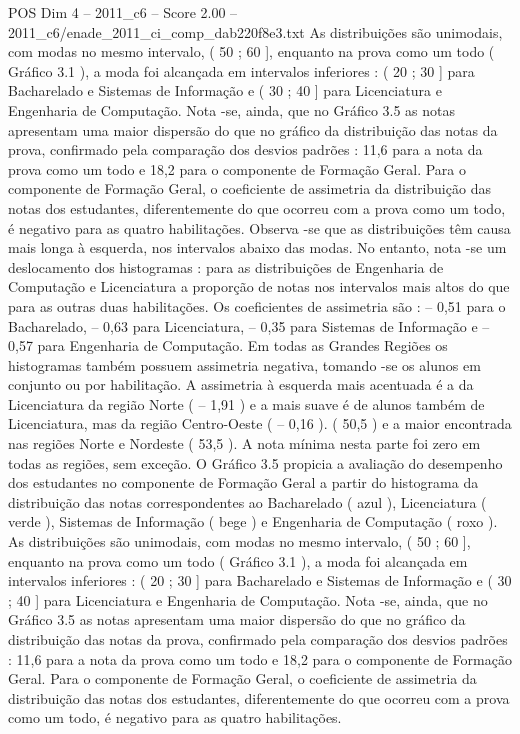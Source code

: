 \begin{textsample}{POS Dim 4 – 2011\_c6 – Score 2.00 – 2011\_c6/enade\_2011\_ci\_comp\_dab220f8e3.txt}
As distribuições são unimodais, com modas no mesmo intervalo, ( 50 ; 60 ], enquanto na prova como um todo ( Gráfico 3.1 ), a moda foi alcançada em intervalos inferiores : ( 20 ; 30 ] para Bacharelado e Sistemas de Informação e ( 30 ; 40 ] para Licenciatura e Engenharia de Computação.
Nota -se, ainda, que no Gráfico 3.5 as notas apresentam uma maior dispersão do que no gráfico da distribuição das notas da prova, confirmado pela comparação dos desvios padrões : 11,6 para a nota da prova como um todo e 18,2 para o componente de Formação Geral.
Para o componente de Formação Geral, o coeficiente de assimetria da distribuição das notas dos estudantes, diferentemente do que ocorreu com a prova como um todo, é negativo para as quatro habilitações.
Observa -se que as distribuições têm causa mais longa à esquerda, nos intervalos abaixo das modas.
No entanto, nota -se um deslocamento dos histogramas : para as distribuições de Engenharia de Computação e Licenciatura a proporção de notas nos intervalos mais altos do que para as outras duas habilitações.
Os coeficientes de assimetria são : – 0,51 para o Bacharelado, – 0,63 para Licenciatura, – 0,35 para Sistemas de Informação e – 0,57 para Engenharia de Computação.
Em todas as Grandes Regiões os histogramas também possuem assimetria negativa, tomando -se os alunos em conjunto ou por habilitação.
A assimetria à esquerda mais acentuada é a da Licenciatura da região Norte ( – 1,91 ) e a mais suave é de alunos também de Licenciatura, mas da região Centro-Oeste ( – 0,16 ). ( 50,5 ) e a maior encontrada nas regiões Norte e Nordeste ( 53,5 ).
A nota mínima nesta parte foi zero em todas as regiões, sem exceção.
O Gráfico 3.5 propicia a avaliação do desempenho dos estudantes no componente de Formação Geral a partir do histograma da distribuição das notas correspondentes ao Bacharelado ( azul ), Licenciatura ( verde ), Sistemas de Informação ( bege ) e Engenharia de Computação ( roxo ).
As distribuições são unimodais, com modas no mesmo intervalo, ( 50 ; 60 ], enquanto na prova como um todo ( Gráfico 3.1 ), a moda foi alcançada em intervalos inferiores : ( 20 ; 30 ] para Bacharelado e Sistemas de Informação e ( 30 ; 40 ] para Licenciatura e Engenharia de Computação.
Nota -se, ainda, que no Gráfico 3.5 as notas apresentam uma maior dispersão do que no gráfico da distribuição das notas da prova, confirmado pela comparação dos desvios padrões : 11,6 para a nota da prova como um todo e 18,2 para o componente de Formação Geral.
Para o componente de Formação Geral, o coeficiente de assimetria da distribuição das notas dos estudantes, diferentemente do que ocorreu com a prova como um todo, é negativo para as quatro habilitações.

\end{textsample}
